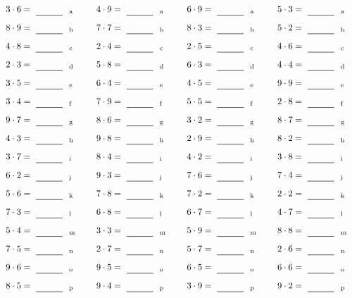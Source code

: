 \documentclass
[
  draft    = true,
  fontsize = 11pt,
  parskip  = half-
]
{scrartcl}
\begin{document}
\par\vfill\par
\begin{align*}
    \pline{3\cdot6}&=\rline{a}
  & \pline{4\cdot9}&=\rline{a}
  & \pline{6\cdot9}&=\rline{a}
  & \pline{5\cdot3}&=\rline{a} \\[1ex]
    \pline{8\cdot9}&=\rline{b}
  & \pline{7\cdot7}&=\rline{b}
  & \pline{8\cdot3}&=\rline{b}
  & \pline{5\cdot2}&=\rline{b} \\[1ex]
    \pline{4\cdot8}&=\rline{c}
  & \pline{2\cdot4}&=\rline{c}
  & \pline{2\cdot5}&=\rline{c}
  & \pline{4\cdot6}&=\rline{c} \\[1ex]
    \pline{2\cdot3}&=\rline{d}
  & \pline{5\cdot8}&=\rline{d}
  & \pline{6\cdot3}&=\rline{d}
  & \pline{4\cdot4}&=\rline{d} \\[1ex]
    \pline{3\cdot5}&=\rline{e}
  & \pline{6\cdot4}&=\rline{e}
  & \pline{4\cdot5}&=\rline{e}
  & \pline{9\cdot9}&=\rline{e} \\[1ex]
    \pline{3\cdot4}&=\rline{f}
  & \pline{7\cdot9}&=\rline{f}
  & \pline{5\cdot5}&=\rline{f}
  & \pline{2\cdot8}&=\rline{f} \\[1ex]
    \pline{9\cdot7}&=\rline{g}
  & \pline{8\cdot6}&=\rline{g}
  & \pline{3\cdot2}&=\rline{g}
  & \pline{8\cdot7}&=\rline{g} \\[1ex]
    \pline{4\cdot3}&=\rline{h}
  & \pline{9\cdot8}&=\rline{h}
  & \pline{2\cdot9}&=\rline{h}
  & \pline{8\cdot2}&=\rline{h} \\[1ex]
    \pline{3\cdot7}&=\rline{i}
  & \pline{8\cdot4}&=\rline{i}
  & \pline{4\cdot2}&=\rline{i}
  & \pline{3\cdot8}&=\rline{i} \\[1ex]
    \pline{6\cdot2}&=\rline{j}
  & \pline{9\cdot3}&=\rline{j}
  & \pline{7\cdot6}&=\rline{j}
  & \pline{7\cdot4}&=\rline{j} \\[1ex]
    \pline{5\cdot6}&=\rline{k}
  & \pline{7\cdot8}&=\rline{k}
  & \pline{7\cdot2}&=\rline{k}
  & \pline{2\cdot2}&=\rline{k} \\[1ex]
    \pline{7\cdot3}&=\rline{l}
  & \pline{6\cdot8}&=\rline{l}
  & \pline{6\cdot7}&=\rline{l}
  & \pline{4\cdot7}&=\rline{l} \\[1ex]
    \pline{5\cdot4}&=\rline{m}
  & \pline{3\cdot3}&=\rline{m}
  & \pline{5\cdot9}&=\rline{m}
  & \pline{8\cdot8}&=\rline{m} \\[1ex]
    \pline{7\cdot5}&=\rline{n}
  & \pline{2\cdot7}&=\rline{n}
  & \pline{5\cdot7}&=\rline{n}
  & \pline{2\cdot6}&=\rline{n} \\[1ex]
    \pline{9\cdot6}&=\rline{o}
  & \pline{9\cdot5}&=\rline{o}
  & \pline{6\cdot5}&=\rline{o}
  & \pline{6\cdot6}&=\rline{o} \\[1ex]
    \pline{8\cdot5}&=\rline{p}
  & \pline{9\cdot4}&=\rline{p}
  & \pline{3\cdot9}&=\rline{p}
  & \pline{9\cdot2}&=\rline{p}
\end{align*}
\end{document}
